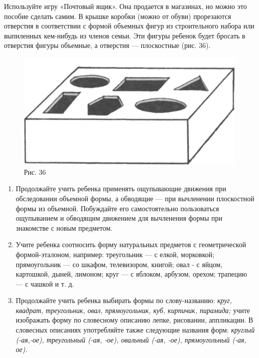 \documentclass{book}
\renewcommand{\emph}[1]{\textit{#1}}
\begin{document}
Используйте игру «Почтовый ящик». Она продается в магазинах, но можно
это пособие сделать самим. В крышке коробки (можно от обуви) прорезаются
отверстия в соответствии с формой объемных фигур из строительного набора
или выпиленных кем-нибудь из членов семьи. Эти фигуры ребенок будет
бросать в отверстия фигуры объемные, а отверстия --- плоскостные (рис.
36).

\begin{figure}
\centering
\includegraphics[width=\linewidth]{media/media/image33.png}
\caption*{Рис. 36}
\end{figure}



\begin{enumerate}
\def\labelenumi{\arabic{enumi}.}
\setcounter{enumi}{4}
\item
  
  Продолжайте учить ребенка применять ощупывающие движения при
  обследовании объемной формы, а обводящие --- при вычленении
  плоскостной формы из объемной. Побуждайте его самостоятельно
  пользоваться ощупыванием и обводящим движением для вычленения формы
  при знакомстве с новым предметом.
  
\item
  
  Учите ребенка соотносить форму натуральных предметов с геометрической
  формой-эталоном, например: треугольник --- с елкой, морковкой;
  прямоугольник --- со шкафом, телевизором, книгой; овал - с яйцом,
  картошкой, дыней, лимоном; круг --- с яблоком, арбузом, орехом;
  трапецию --- с чашкой и т. д.
  
\item
  
  Продолжайте учить ребенка выбирать формы по слову-названию:
  \emph{круг, квадрат, треугольник, овал, прямоугольник, куб, кирпичик,
  пирамида;} учите изображать форму по словесному описанию лепке,
  рисовании, аппликации. В словесных описаниях употребляйте также
  следующие названия форм: \emph{круглый (-ая,-ое), треугольный (-ая,
  -ое), овальный (-ая, -ое), прямоугольный (-ая, ое).}
  
\end{enumerate}
\end{document}
